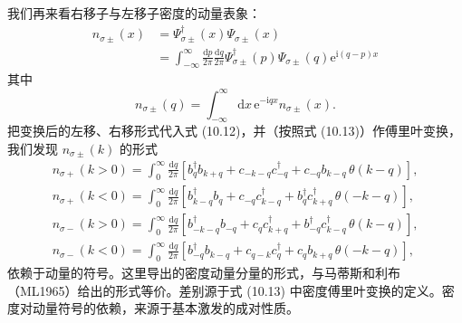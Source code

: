 我们再来看右移子与左移子密度的动量表象：
\begin{align*}
n_{\sigma\pm}(x)&=\Psi_{\sigma\pm}^{\dagger}(x)\Psi_{\sigma\pm}(x)\\
&=\int_{-\infty}^{\infty}\frac{\mathrm{d}p}{2\pi}\frac{\mathrm{d}q}{2\pi}\Psi_{\sigma\pm}^{\dagger}(p)\Psi_{\sigma\pm}(q)\mathrm{e}^{\mathrm{i}(q-p)x}
\tag{10.12}
\end{align*}
其中
\begin{equation*}
n_{\sigma\pm}(q)=\int_{-\infty}^{\infty}\mathrm{d}x\,\mathrm{e}^{-\mathrm{i}qx}n_{\sigma\pm}(x).
\tag{10.13}
\end{equation*}
把变换后的左移、右移形式代入式 (10.12)，并（按照式 (10.13)）作傅里叶变换，我们发现 $n_{\sigma\pm}(k)$ 的形式
\begin{gather*}
n_{\sigma+}(k>0)=\int_{0}^{\infty}\frac{\mathrm{d}q}{2\pi}\left[b_{q}^{\dagger}b_{k+q}+c_{-k-q}c_{-q}^{\dagger}+c_{-q}b_{k-q}\,\theta(k-q)\right],\\
n_{\sigma+}(k<0)=\int_{0}^{\infty}\frac{\mathrm{d}q}{2\pi}\left[b_{k-q}^{\dagger}b_{q}+c_{-q}c_{k-q}^{\dagger}+b_{q}^{\dagger}c_{k+q}^{\dagger}\,\theta(-k-q)\right],\\
n_{\sigma-}(k>0)=\int_{0}^{\infty}\frac{\mathrm{d}q}{2\pi}\left[b_{-k-q}^{\dagger}b_{-q}+c_{q}c_{k+q}^{\dagger}+b_{-q}^{\dagger}c_{k-q}^{\dagger}\,\theta(k-q)\right],\\
n_{\sigma-}(k<0)=\int_{0}^{\infty}\frac{\mathrm{d}q}{2\pi}\left[b_{-q}^{\dagger}b_{k-q}+c_{q-k}c_{q}^{\dagger}+c_{q}b_{k+q}\,\theta(-k-q)\right],
\end{gather*}
依赖于动量的符号。这里导出的密度动量分量的形式，与马蒂斯和利布（ML1965）给出的形式等价。差别源于式 (10.13) 中密度傅里叶变换的定义。密度对动量符号的依赖，来源于基本激发的成对性质。

